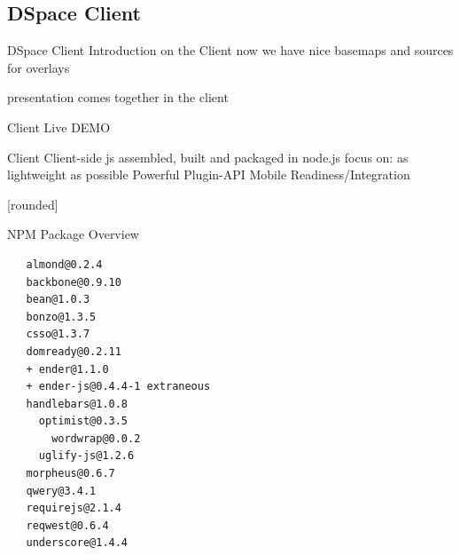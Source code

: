 \documentclass{beamer}
\newcommand\Fontvi{\fontsize{6}{7.2}\selectfont}
\begin{document}
\subsection{DSpace Client}

\begin{frame}{DSpace Client}
 Introduction on the Client
 now we have nice basemaps and sources for overlays

 presentation comes together in the client
\end{frame}


\begin{frame}{Client}
Live DEMO
\end{frame}

\begin{frame}{Client}
Client-side js
assembled, built and packaged in node.js
focus on: as lightweight as possible
Powerful Plugin-API
Mobile Readiness/Integration
\end{frame}



[rounded]
\begin{frame}[fragile]{NPM Package Overview}
\Fontvi
{}
\begin{block}{}
\begin{lstlisting}
   almond@0.2.4
   backbone@0.9.10
   bean@1.0.3
   bonzo@1.3.5
   csso@1.3.7
   domready@0.2.11
   + ender@1.1.0
   + ender-js@0.4.4-1 extraneous
   handlebars@1.0.8
     optimist@0.3.5
       wordwrap@0.0.2
     uglify-js@1.2.6
   morpheus@0.6.7
   qwery@3.4.1
   requirejs@2.1.4
   reqwest@0.6.4
   underscore@1.4.4
\end{lstlisting}
\end{block}
\end{frame}
\end{document}
